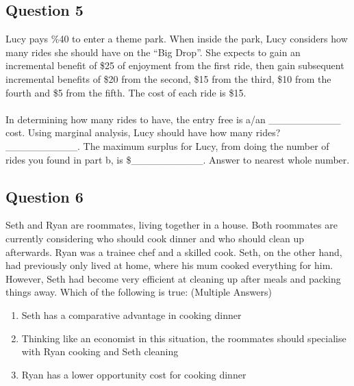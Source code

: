 \subsection{Question 5}
Lucy pays \%40 to enter a theme park. When inside the park, Lucy considers how many rides she should have on the ``Big Drop''. She expects to gain an incremental benefit of \$25 of enjoyment from the first ride, then gain subsequent incremental benefits of \$20 from the second, \$15 from the third, \$10 from the fourth and \$5 from the fifth. The cost of each ride is \$15.\\\\
In determining how many rides to have, the entry free is a/an \_\_\_\_\_\_\_\_\_\_ cost. Using marginal analysis, Lucy should have how many rides? \_\_\_\_\_\_\_\_\_\_. The maximum surplus for Lucy, from doing the number of rides you found in part b, is \$\_\_\_\_\_\_\_\_\_\_. Answer to nearest whole number.

\subsection{Question 6}
Seth and Ryan are roommates, living together in a house. Both roommates are currently considering who should cook dinner and who should clean up afterwards. Ryan was a trainee chef and a skilled cook. Seth, on the other hand, had previously only lived at home, where his mum cooked everything for him. However, Seth had become very efficient at cleaning up after meals and packing things away. Which of the following is true: (Multiple Answers)
\begin{enumerate}
	\item Seth has a comparative advantage in cooking dinner
	\item Thinking like an economist in this situation, the roommates should specialise with Ryan cooking and Seth cleaning
	\item Ryan has a lower opportunity cost for cooking dinner
\end{enumerate}

